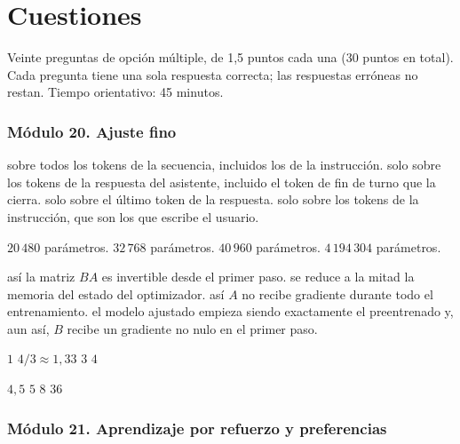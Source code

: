 \chapter{Cuestiones}
\label{cap:test}

Veinte preguntas de opción múltiple, de 1,5 puntos cada una (30 puntos en total). Cada pregunta tiene una sola respuesta correcta; las respuestas erróneas no restan. Tiempo orientativo: 45 minutos.

\subsection*{Módulo 20. Ajuste fino}

{sobre todos los tokens de la secuencia, incluidos los de la instrucción.}
{solo sobre los tokens de la respuesta del asistente, incluido el token de fin de turno que la cierra.}
{solo sobre el último token de la respuesta.}
{solo sobre los tokens de la instrucción, que son los que escribe el usuario.}

{$20\,480$ parámetros.}
{$32\,768$ parámetros.}
{$40\,960$ parámetros.}
{$4\,194\,304$ parámetros.}

{así la matriz $BA$ es invertible desde el primer paso.}
{se reduce a la mitad la memoria del estado del optimizador.}
{así $A$ no recibe gradiente durante todo el entrenamiento.}
{el modelo ajustado empieza siendo exactamente el preentrenado y, aun así, $B$ recibe un gradiente no nulo en el primer paso.}

{$1$}
{$4/3\approx 1{,}33$}
{$3$}
{$4$}

{$4{,}5$}
{$5$}
{$8$}
{$36$}

\subsection*{Módulo 21. Aprendizaje por refuerzo y preferencias}

